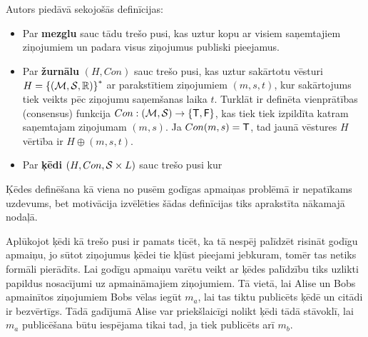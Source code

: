 Autors piedāvā sekojošās definīcijas:
\begin{itemize}
    \item Par \textbf{mezglu} sauc tādu trešo pusi, kas uztur kopu ar visiem saņemtajiem ziņojumiem un padara visus ziņojumus publiski pieejamus.
    \item Par \textbf{žurnālu} $(H, Con)$ sauc trešo pusi, kas uztur sakārtotu vēsturi
        $H = {\{(\mathcal{M}, \mathcal{S}, \mathbb{R})\}}^*$
        ar parakstītiem ziņojumiem $(m,s,t)$,
        kur sakārtojums tiek veikts pēc ziņojumu saņemšanas laika $t$.
        Turklāt ir definēta vienprātības (consensus) funkcija
        $Con: (\mathcal{M},\mathcal{S}) \rightarrow \left\{ \textsf{T},\textsf{F} \right\}$,
        kas tiek tiek izpildīta katram saņemtajam ziņojumam $(m,s)$.
        Ja $Con(m,s) = \textsf{T}$, tad jaunā vēstures $H$ vērtība ir $H\oplus (m,s,t)$.
    \item Par \textbf{ķēdi} $(H, Con, \mathcal{S}\times L)$ sauc trešo pusi kur %
\end{itemize}
Ķēdes definēšana kā viena no pusēm godīgas apmaiņas problēmā ir nepatīkams uzdevums, bet motivācija izvēlēties šādas definīcijas tiks aprakstīta nākamajā nodaļā.

Aplūkojot ķēdi kā trešo pusi ir pamats ticēt, ka tā nespēj palīdzēt risināt godīgu apmaiņu, jo sūtot ziņojumus ķēdei tie kļūst pieejami jebkuram, tomēr tas netiks formāli pierādīts. Lai godīgu apmaiņu varētu veikt ar ķēdes palīdzību tiks uzlikti papildus nosacījumi uz apmaināmajiem ziņojumiem. Tā vietā, lai Alise un Bobs apmainītos ziņojumiem Bobs vēlas iegūt $m_a$, lai tas tiktu publicēts ķēdē un citādi ir bezvērtīgs. Tādā gadījumā Alise var priekšlaicīgi nolikt ķēdi tādā stāvoklī, lai $m_a$ publicēšana būtu iespējama tikai tad, ja tiek publicēts arī $m_b$.
